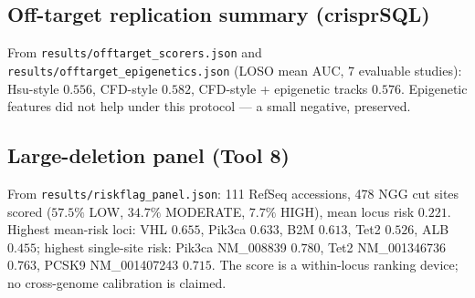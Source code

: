 \subsection{Off-target replication summary (crisprSQL)}
From \texttt{results/offtarget\_scorers.json} and
\texttt{results/offtarget\_epigenetics.json} (LOSO mean AUC, 7 evaluable
studies): Hsu-style $0.556$, CFD-style $0.582$, CFD-style + epigenetic
tracks $0.576$. Epigenetic features did not help under this protocol ---
a small negative, preserved.

\subsection{Large-deletion panel (Tool 8)}
From \texttt{results/riskflag\_panel.json}: 111 RefSeq accessions, 478 NGG
cut sites scored ($57.5\%$ LOW, $34.7\%$ MODERATE, $7.7\%$ HIGH), mean
locus risk $0.221$. Highest mean-risk loci: VHL $0.655$, Pik3ca $0.633$,
B2M $0.613$, Tet2 $0.526$, ALB $0.455$; highest single-site risk:
Pik3ca NM\_008839 $0.780$, Tet2 NM\_001346736 $0.763$, PCSK9
NM\_001407243 $0.715$. The score is a within-locus ranking device; no
cross-genome calibration is claimed.

